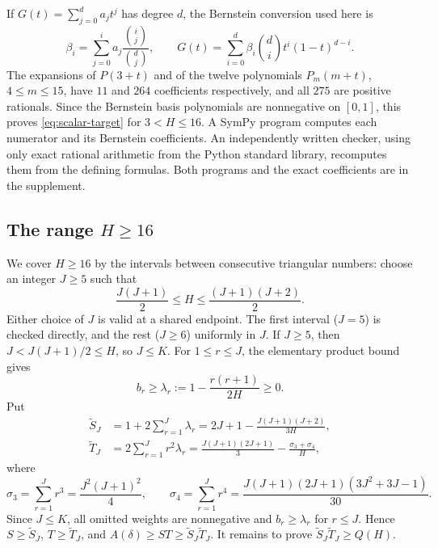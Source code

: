 \documentclass[ECP,preprint]{ejpecp}
\begin{document}
If $G(t)=\sum_{j=0}^d a_jt^j$ has degree $d$, the Bernstein conversion used
here is
\begin{equation}\label{eq:bernstein-conversion}
  \beta_i=\sum_{j=0}^i a_j
  \frac{\binom{i}{j}}{\binom{d}{j}},
  \qquad
  G(t)=\sum_{i=0}^d \beta_i\binom di t^i(1-t)^{d-i}.
\end{equation}
The expansions of $P(3+t)$ and of the twelve polynomials $P_m(m+t)$,
$4\leq m\leq15$, have $11$ and $264$ coefficients respectively, and all
$275$ are positive rationals. Since the Bernstein basis polynomials are
nonnegative on $[0,1]$, this proves \eqref{eq:scalar-target} for
$3<H\leq16$. A SymPy program computes each numerator and its Bernstein
coefficients. An independently written checker, using only exact rational
arithmetic from the Python standard library, recomputes them from the
defining formulas. Both programs and the
exact coefficients are in the supplement.

\subsection{The range \texorpdfstring{$H\geq16$}{H >= 16}}
\label{sec:large}

We cover $H\geq16$ by the intervals between consecutive triangular numbers:
choose an integer $J\geq5$ such that
\begin{equation}\label{eq:triangular-cell}
  \frac{J(J+1)}2\leq H\leq\frac{(J+1)(J+2)}2.
\end{equation}
Either choice of $J$ is valid at a shared endpoint. The first interval
($J=5$) is checked directly, and the rest ($J\geq6$) uniformly in $J$. If
$J\geq5$, then $J<J(J+1)/2\leq H$, so $J\leq K$. For $1\leq r\leq J$, the elementary product
bound gives
\begin{equation}\label{eq:bonferroni}
  b_r\geq\lambda_r:=1-\frac{r(r+1)}{2H}\geq0.
\end{equation}
Put
\begin{align}
  \tilde S_J&=1+2\sum_{r=1}^J \lambda_r
  =2J+1-\frac{J(J+1)(J+2)}{3H},
  \label{eq:S0}\\
  \tilde T_J&=2\sum_{r=1}^Jr^2\lambda_r
  =\frac{J(J+1)(2J+1)}3-\frac{\sigma_3+\sigma_4}{H},
  \label{eq:T0}
\end{align}
where
\[
  \sigma_3=\sum_{r=1}^Jr^3=\frac{J^2(J+1)^2}{4},
  \qquad
  \sigma_4=\sum_{r=1}^Jr^4=\frac{J(J+1)(2J+1)(3J^2+3J-1)}{30}.
\]
Since $J\leq K$, all omitted weights are nonnegative and $b_r\geq\lambda_r$
for $r\leq J$. Hence $S\geq\tilde S_J$, $T\geq\tilde T_J$, and
$A(\delta)\geq ST\geq\tilde S_J\tilde T_J$. It remains to prove
$\tilde S_J\tilde T_J\geq Q(H)$.
\end{document}
